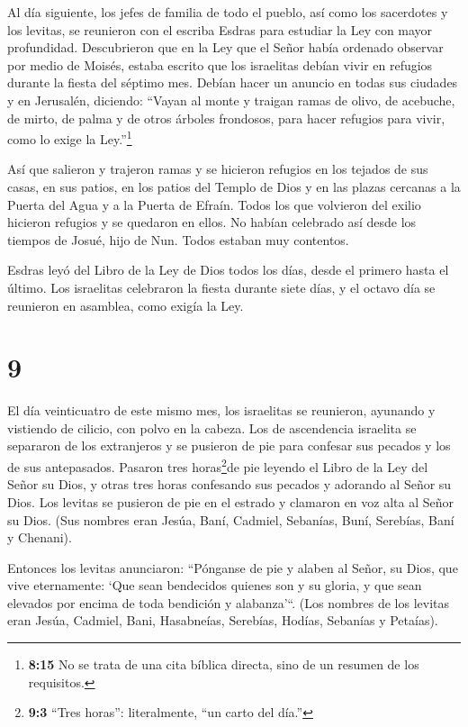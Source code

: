  Al día siguiente, los jefes de familia de todo el pueblo,
así como los sacerdotes y los levitas, se reunieron con el escriba
Esdras para estudiar la Ley con mayor profundidad. 
Descubrieron que en la Ley que el Señor había ordenado observar por
medio de Moisés, estaba escrito que los israelitas debían vivir en
refugios durante la fiesta del séptimo mes.  Debían hacer
un anuncio en todas sus ciudades y en Jerusalén, diciendo: ``Vayan al
monte y traigan ramas de olivo, de acebuche, de mirto, de palma y de
otros árboles frondosos, para hacer refugios para vivir, como lo exige
la Ley.''\footnote{\textbf{8:15} No se trata de una cita bíblica
  directa, sino de un resumen de los requisitos.}

 Así que salieron y trajeron ramas y se hicieron refugios
en los tejados de sus casas, en sus patios, en los patios del Templo de
Dios y en las plazas cercanas a la Puerta del Agua y a la Puerta de
Efraín.  Todos los que volvieron del exilio hicieron
refugios y se quedaron en ellos. No habían celebrado así desde los
tiempos de Josué, hijo de Nun. Todos estaban muy contentos.

 Esdras leyó del Libro de la Ley de Dios todos los días,
desde el primero hasta el último. Los israelitas celebraron la fiesta
durante siete días, y el octavo día se reunieron en asamblea, como
exigía la Ley.

\hypertarget{section-8}{%
\section{9}\label{section-8}}

 El día veinticuatro de este mismo mes, los israelitas se
reunieron, ayunando y vistiendo de cilicio, con polvo en la cabeza.
 Los de ascendencia israelita se separaron de los
extranjeros y se pusieron de pie para confesar sus pecados y los de sus
antepasados.  Pasaron tres horas\footnote{\textbf{9:3}
  ``Tres horas'': literalmente, ``un carto del día.''}de pie leyendo el
Libro de la Ley del Señor su Dios, y otras tres horas confesando sus
pecados y adorando al Señor su Dios.  Los levitas se
pusieron de pie en el estrado y clamaron en voz alta al Señor su Dios.
(Sus nombres eran Jesúa, Baní, Cadmiel, Sebanías, Buní, Serebías, Baní y
Chenani).

 Entonces los levitas anunciaron: ``Pónganse de pie y alaben
al Señor, su Dios, que vive eternamente: `Que sean bendecidos quienes
son y su gloria, y que sean elevados por encima de toda bendición y
alabanza'``. (Los nombres de los levitas eran Jesúa, Cadmiel, Bani,
Hasabneías, Serebías, Hodías, Sebanías y Petaías).

